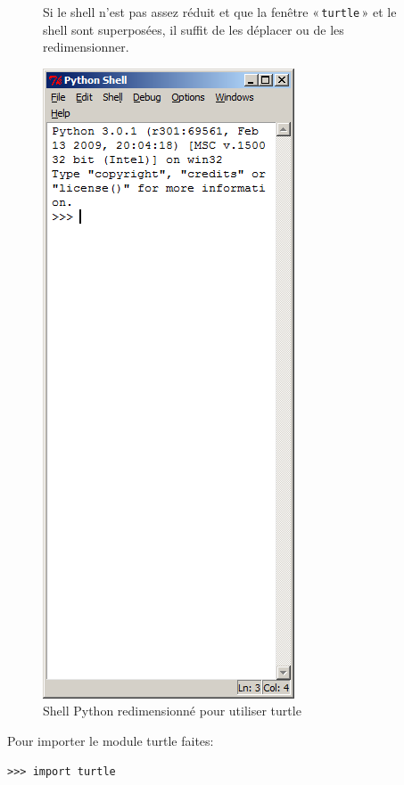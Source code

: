 \begin{figure}[ht]
\begin{minipage}{0.4\linewidth}
Si le shell n'est pas assez réduit et que la fenêtre « \texttt{turtle} » et le shell sont superposées, il suffit de les déplacer ou de les redimensionner.
\end{minipage}
\hspace{0.5cm}
\begin{minipage}{0.5\linewidth}
\centering
\includegraphics[scale=0.5]{images/shell_pour_turtle.png}
\caption{Shell Python redimensionné pour utiliser turtle}
\label{fig:shellami}
\end{minipage}
\end{figure}

Pour importer le module turtle faites:

\begin{Verbatim}[frame=single,rulecolor=\color{mbleu}, label=à taper]
>>> import turtle
\end{Verbatim}


